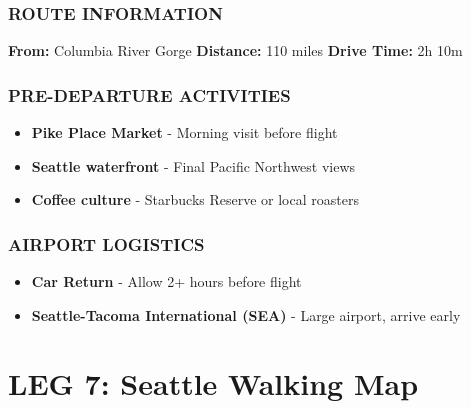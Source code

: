 \documentclass[
  10pt,
]{article}
\providecommand{\tightlist}{%
  \setlength{\itemsep}{0pt}\setlength{\parskip}{0pt}}
\begin{document}
\subsubsection{\texorpdfstring{\textcolor{primary}{ROUTE INFORMATION}}{}}\label{section-49}

\textbf{\textcolor{secondary}{From:}} Columbia River Gorge \textbar{}
\textbf{\textcolor{secondary}{Distance:}} 110 miles \textbar{}
\textbf{\textcolor{secondary}{Drive Time:}} 2h 10m

\subsubsection{\texorpdfstring{\textcolor{primary}{PRE-DEPARTURE ACTIVITIES}}{}}\label{section-50}

\begin{itemize}
\tightlist
\item
  \textbf{\textcolor{secondary}{Pike Place Market}} - Morning visit
  before flight
\item
  \textbf{\textcolor{secondary}{Seattle waterfront}} - Final Pacific
  Northwest views\\
\item
  \textbf{\textcolor{secondary}{Coffee culture}} - Starbucks Reserve or
  local roasters
\end{itemize}

\subsubsection{\texorpdfstring{\textcolor{primary}{AIRPORT LOGISTICS}}{}}\label{section-51}

\begin{itemize}
\tightlist
\item
  \textbf{\textcolor{secondary}{Car Return}} - Allow 2+ hours before
  flight
\item
  \textbf{\textcolor{secondary}{Seattle-Tacoma International (SEA)}} -
  Large airport, arrive early
\end{itemize}

\newpage

\section{\texorpdfstring{\textcolor{primary}{LEG 7: Seattle Walking Map}}{}}\label{section-52}
\end{document}
